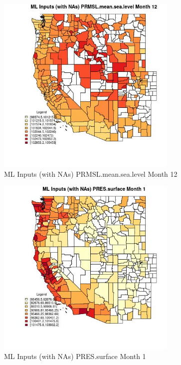 \begin{figure} 
\centering  
\includegraphics[width=0.77\textwidth]{Code_Outputs/Report_ML_input_PM25_Step4_part_f_de_duplicated_aves_prioritize_24hr_obswNAs_CountyPRMSLmeansealevelmedianMonth12.jpg} 
\caption{\label{fig:Report_ML_input_PM25_Step4_part_f_de_duplicated_aves_prioritize_24hr_obswNAsCountyPRMSLmeansealevelmedianMonth12}ML Inputs (with NAs) PRMSL.mean.sea.level Month 12} 
\end{figure} 
 

\begin{figure} 
\centering  
\includegraphics[width=0.77\textwidth]{Code_Outputs/Report_ML_input_PM25_Step4_part_f_de_duplicated_aves_prioritize_24hr_obswNAs_CountyPRESsurfacemedianMonth1.jpg} 
\caption{\label{fig:Report_ML_input_PM25_Step4_part_f_de_duplicated_aves_prioritize_24hr_obswNAsCountyPRESsurfacemedianMonth1}ML Inputs (with NAs) PRES.surface Month 1} 
\end{figure} 
 

